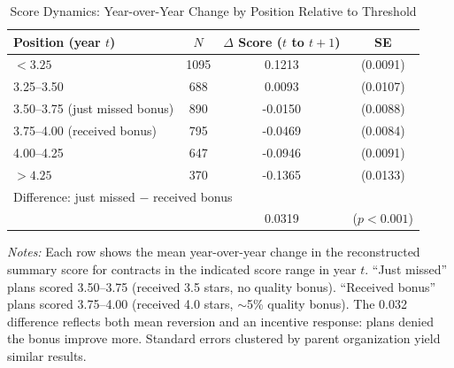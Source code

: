 \begin{table}[t]
\centering
\caption{Score Dynamics: Year-over-Year Change by Position Relative to Threshold}
\label{tab:dynamics}
\begin{threeparttable}
\begin{tabular}{lccc}
\hline\hline
Position (year $t$) & $N$ & $\Delta$ Score ($t$ to $t+1$) & SE \\
\hline
$< 3.25$ & 1095 & 0.1213 & (0.0091) \\
3.25--3.50 & 688 & 0.0093 & (0.0107) \\
3.50--3.75 (just missed bonus) & 890 & -0.0150 & (0.0088) \\
3.75--4.00 (received bonus) & 795 & -0.0469 & (0.0084) \\
4.00--4.25 & 647 & -0.0946 & (0.0091) \\
$> 4.25$ & 370 & -0.1365 & (0.0133) \\
\hline
\multicolumn{4}{l}{Difference: just missed $-$ received bonus} \\
\quad & & 0.0319 & ($p < 0.001$) \\
\hline\hline
\end{tabular}
\begin{tablenotes}
\item \textit{Notes:} Each row shows the mean year-over-year change in the reconstructed
summary score for contracts in the indicated score range in year $t$. ``Just missed'' plans
scored 3.50--3.75 (received 3.5 stars, no quality bonus). ``Received bonus'' plans scored
3.75--4.00 (received 4.0 stars, $\sim$5\% quality bonus). The 0.032 difference reflects both
mean reversion and an incentive response: plans denied the bonus improve more.
Standard errors clustered by parent organization yield similar results.
\end{tablenotes}
\end{threeparttable}
\end{table}
